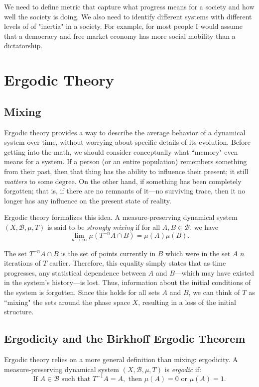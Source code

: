 \documentclass{article}
\begin{document}
We need to define metric that capture what progress means for a society and how well the society is doing. We also need to identify different systems with different levels of of "inertia" in a society. For example, for most people I would assume that a democracy and free market economy has more social mobility than a dictatorship.

\appendix
\section{Ergodic Theory}

\subsection{Mixing}

Ergodic theory provides a way to describe the average behavior of a dynamical system over time, without worrying about specific details of its evolution. Before getting into the math, we should consider conceptually what ``memory" even means for a system. If a person (or an entire population) remembers something from their past, then that thing has the ability to influence their present; it still \emph{matters} to some degree. On the other hand, if something has been completely forgotten; that is, if there are no remnants of it––no surviving trace, then it no longer has any influence on the present state of reality.



Ergodic theory formalizes this idea. A measure-preserving dynamical system $(X,\mathcal{B},\mu,T)$ is said to be \textit{strongly mixing} if for all $A,B \in\mathcal{B}$, we have 
\[ \lim_{n\to\infty}\mu(T^{-n}A\cap B) = \mu(A)\mu(B). \]

The set $T^{-n}A\cap B$ is the set of points currently in $B$ which were in the set $A$ $n$ iterations of $T$ earlier. Therefore, this equality simply states that as time progresses, any statistical dependence between $A$ and $B$––which may have existed in the system's history––is lost. Thus, information about the initial conditions of the system is forgotten. Since this holds for all sets $A$ and $B$, we can think of $T$ as ``mixing" the sets around the phase space $X$, resulting in a loss of the initial structure.

\subsection{Ergodicity and the Birkhoff Ergodic Theorem}
Ergodic theory relies on a more general definition than mixing: ergodicity. A measure-preserving dynamical system $(X,\mathcal{B},\mu,T)$ is \textit{ergodic} if:
\[ \text{If } A\in\mathcal{B} \text{ such that } T^{-1}A=A, \text{ then } \mu(A)=0\text{ or } \mu(A)=1. \]
\end{document}
